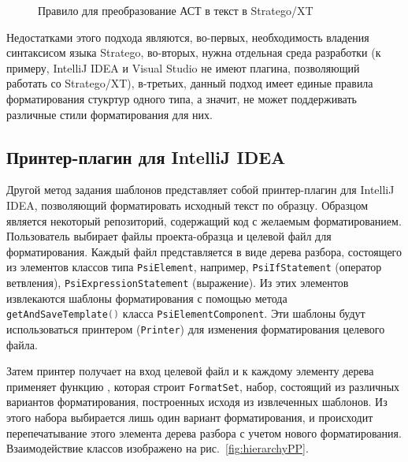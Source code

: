 

\begin{figure}[h]
	\centering
	
	\caption{Правило для преобразование АСТ в текст в Stratego/XT}
	\label{fig:strategopp}
\end{figure}


Недостатками этого подхода являются, во-первых, необходимость владения синтаксисом языка Stratego, во-вторых, нужна отдельная среда разработки (к примеру, IntelliJ IDEA и Visual Studio не имеют плагина, позволяющий работать со Stratego/XT), в-третьих, данный подход имеет единые правила форматирования стукртур одного типа, а значит, не может поддерживать различные стили форматирования для них.

\subsection{Принтер-плагин для IntelliJ IDEA}
Другой метод задания шаблонов представляет собой принтер-плагин для IntelliJ IDEA, позволяющий форматировать исходный текст по образцу. Образцом является некоторый репозиторий, содержащий код с желаемым форматированием.
Пользователь выбирает файлы проекта-образца и целевой файл для форматирования. Каждый файл представляется в виде дерева разбора, состоящего из элементов классов типа \lstinline[language=C++]{PsiElement}\cite{intellij:plugdev}, например, \lstinline[language=C++]{PsiIfStatement} (оператор ветвления), \lstinline[language=C++]{PsiExpressionStatement} (выражение). Из этих элементов извлекаются шаблоны 
форматирования с помощью метода \lstinline[language=C++]{getAndSaveTemplate()} 
класса \lstinline[language=C++]{PsiElementComponent}. Эти шаблоны будут 
использоваться принтером (\lstinline[language=C++]{Printer}) для изменения 
форматирования целевого файла.

Затем принтер получает на вход целевой файл и к каждому элементу дерева 
применяет функцию%
, которая строит 
\lstinline[language=C++]{FormatSet}, набор, состоящий из различных вариантов 
форматирования, построенных исходя из извлеченных шаблонов. Из этого набора
выбирается лишь один вариант форматирования, и происходит перепечатывание
этого элемента дерева разбора с учетом нового форматирования.
Взаимодействие классов изображено на рис.~\ref{fig:hierarchyPP}.

